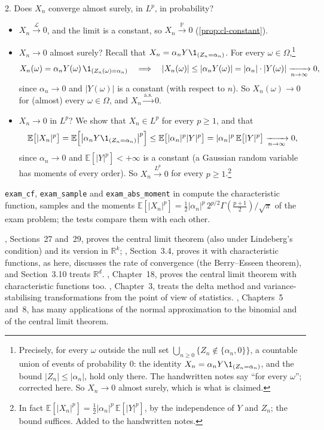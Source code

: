 \begin{example}
2. Does $X_n$ converge almost surely, in $L^p$, in probability?
\begin{itemize}
  \item $X_n\xrightarrow{\mathcal L}0$, and the limit is a constant, so $X_n\xrightarrow{\mathbb P}0$
    (\cref{prop:cl-constant}).
  \item $X_n\to0$ almost surely? Recall that $X_n=\alpha_nY\1_{(Z_n=\alpha_n)}$. For every
    $\omega\in\Omega$,\footnote{Precisely, for every $\omega$ outside the null set
    $\bigcup_{n\ge0}\{Z_n\notin\{\alpha_n,0\}\}$, a countable union of events of probability
    $0$: the identity $X_n=\alpha_nY\1_{(Z_n=\alpha_n)}$, and the bound $|Z_n|\le|\alpha_n|$, hold
    only there. The handwritten notes say ``for every $\omega$''; corrected here. So $X_n\to0$
    almost surely, which is what is claimed.}
    \[
      X_n(\omega)=\alpha_nY(\omega)\,\1_{(Z_n(\omega)=\alpha_n)}
      \quad\Longrightarrow\quad|X_n(\omega)|\le|\alpha_nY(\omega)|=|\alpha_n|\cdot|Y(\omega)|
      \xrightarrow[n\to\infty]{}0,
    \]
    since $\alpha_n\to0$ and $|Y(\omega)|$ is a constant (with respect to $n$). So
    $X_n(\omega)\to0$ for (almost) every $\omega\in\Omega$, and $X_n\xrightarrow{\text{a.s.}}0$.
  \item $X_n\to0$ in $L^p$? We show that $X_n\in L^p$ for every $p\ge1$, and that
    \[
      \mathbb E\big[|X_n|^p\big]=\mathbb E\Big[\big|\alpha_nY\1_{(Z_n=\alpha_n)}\big|^p\Big]
      \le\mathbb E\big[|\alpha_n|^p|Y|^p\big]=|\alpha_n|^p\,\mathbb E\big[|Y|^p\big]\xrightarrow[n\to\infty]{}0,
    \]
    since $\alpha_n\to0$ and $\mathbb E[|Y|^p]<+\infty$ is a constant (a Gaussian random variable
    has moments of every order). So $X_n\xrightarrow{L^p}0$ for every $p\ge1$.\footnote{In fact
    $\mathbb E[|X_n|^p]=\frac12|\alpha_n|^p\,\mathbb E[|Y|^p]$, by the independence of $Y$ and $Z_n$;
    the bound suffices. Added to the handwritten notes.}
\end{itemize}
\end{example}

\begin{remark}[computational]\label{rem:ct-code-exam}
\sloppy
\texttt{exam\_cf}, \texttt{exam\_sample} and \texttt{exam\_abs\_moment} in
 compute the characteristic function, samples and the moments
$\mathbb E[|X_n|^p]=\frac12|\alpha_n|^p\,2^{p/2}\Gamma(\frac{p+1}2)/\sqrt\pi$ of the exam problem;
the tests compare them with each other.
\end{remark}

\furtherreading
\textcite{billingsley}, Sections~27 and~29, proves the central limit theorem (also under
Lindeberg's condition) and its version in $\mathbb R^k$; \textcite{durrett}, Section~3.4, proves it
with characteristic functions, as here, discusses the rate of convergence (the Berry--Esseen
theorem), and Section~3.10 treats $\mathbb R^d$. \textcite{williams}, Chapter~18, proves the central
limit theorem with characteristic functions too. \textcite{vandervaart-asymptotic}, Chapter~3, treats
the delta method and variance-stabilising transformations from the point of view of statistics.
\textcite{ross-5}, Chapters~5 and~8, has many applications of the normal approximation to the
binomial and of the central limit theorem.
